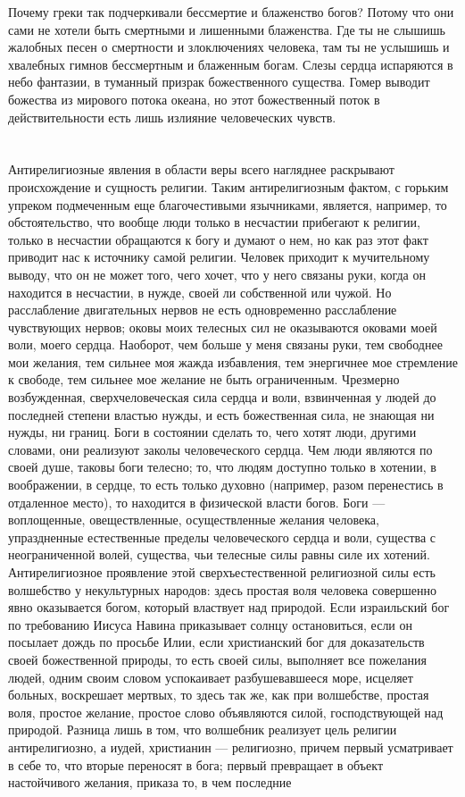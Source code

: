 \documentclass[12pt,oneside]{book}
\begin{document}
Почему греки так подчеркивали бессмертие и блаженство богов? Потому что они сами не хотели быть смертными и лишенными блаженства. Где ты не слышишь жалобных песен о смертности и злоключениях человека, там ты не услышишь и хвалебных гимнов бессмертным и блаженным богам. Слезы сердца испаряются в небо фантазии, в туманный призрак божественного существа. Гомер выводит божества из мирового потока океана, но этот божественный поток в действительности есть лишь излияние человеческих чувств.


\chapter{}

Антирелигиозные явления в области веры всего нагляднее раскрывают происхождение и сущность религии. Таким антирелигиозным фактом, с горьким упреком подмеченным еще благочестивыми язычниками, является, например, то обстоятельство, что вообще люди только в несчастии прибегают к религии, только в несчастии обращаются к богу и думают о нем, но как раз этот факт приводит нас к источнику самой религии. Человек приходит к мучительному выводу, что он не может того, чего хочет, что у него связаны руки, когда он находится в несчастии, в нужде, своей ли собственной или чужой. Но расслабление двигательных нервов не есть одновременно расслабление чувствующих нервов; оковы моих телесных сил не оказываются оковами моей воли, моего сердца. Наоборот, чем больше у меня связаны руки, тем свободнее мои желания, тем сильнее моя жажда избавления, тем энергичнее мое стремление к свободе, тем сильнее мое желание не быть ограниченным. Чрезмерно возбужденная, сверхчеловеческая сила сердца и воли, взвинченная у людей до последней степени властью нужды, и есть божественная сила, не знающая ни нужды, ни границ. Боги в состоянии сделать то, чего хотят люди, другими словами, они реализуют заколы человеческого сердца. Чем люди являются по своей душе, таковы боги телесно; то, что людям доступно только в хотении, в воображении, в сердце, то есть только духовно (например, разом перенестись в отдаленное место), то находится в физической власти богов. Боги --- воплощенные, овеществленные, осуществленные желания человека, упраздненные естественные пределы человеческого сердца и воли, существа с неограниченной волей, существа, чьи телесные силы равны силе их хотений. Антирелигиозное проявление этой сверхъестественной религиозной силы есть волшебство у некультурных народов: здесь простая воля человека совершенно явно оказывается богом, который властвует над природой. Если израильский бог по требованию Иисуса Навина приказывает солнцу остановиться, если он посылает дождь по просьбе Илии, если христианский бог для доказательств своей божественной природы, то есть своей силы, выполняет все пожелания людей, одним своим словом успокаивает разбушевавшееся море, исцеляет больных, воскрешает мертвых, то здесь так же, как при волшебстве, простая воля, простое желание, простое слово объявляются силой, господствующей над природой. Разница лишь в том, что волшебник реализует цель религии антирелигиозно, а иудей, христианин --- религиозно, причем первый усматривает в себе то, что вторые переносят в бога; первый превращает в объект настойчивого желания, приказа то, в чем последние 
\end{document}
